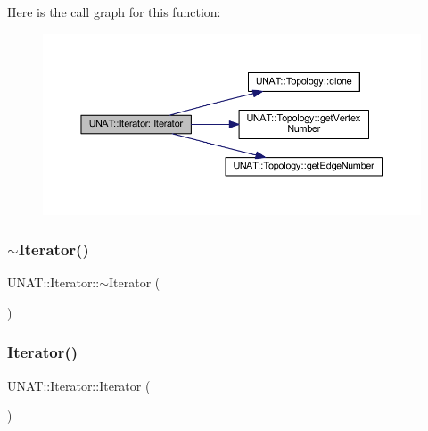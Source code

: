 Here is the call graph for this function\+:
\nopagebreak
\begin{figure}[H]
\begin{center}
\leavevmode
\includegraphics[width=350pt]{classUNAT_1_1Iterator_acc1365ff1a2078c14424624b75fe2c7e_cgraph}
\end{center}
\end{figure}
\mbox{\label{classUNAT_1_1Iterator_a5fe65bc2a92032f20c20adf525e0aa26}} 
\subsubsection{\texorpdfstring{$\sim$Iterator()}{~Iterator()}\hspace{0.1cm}{\footnotesize\ttfamily [1/2]}}
{\footnotesize\ttfamily U\+N\+A\+T\+::\+Iterator\+::$\sim$\+Iterator (\begin{DoxyParamCaption}{ }\end{DoxyParamCaption})\hspace{0.3cm}{\ttfamily [inline]}}

\mbox{\label{classUNAT_1_1Iterator_a3a341a86404dce424bc82e4a991ef29b}} 
\subsubsection{\texorpdfstring{Iterator()}{Iterator()}\hspace{0.1cm}{\footnotesize\ttfamily [3/4]}}
{\footnotesize\ttfamily U\+N\+A\+T\+::\+Iterator\+::\+Iterator (\begin{DoxyParamCaption}{ }\end{DoxyParamCaption})\hspace{0.3cm}{\ttfamily [inline]}}

